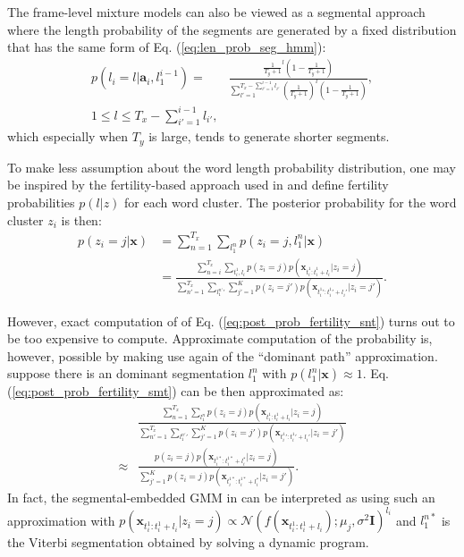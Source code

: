 \documentclass[journal]{IEEEtran}
\begin{document}
The frame-level mixture models can also be viewed as a segmental approach where the length probability of the segments are generated by a fixed distribution that has the same form of Eq. (\ref{eq:len_prob_seg_hmm}):
\begin{align}\label{eq:len_prob_seg_mixture_smt}
    p(l_i=l|\mathbf a_i, l_1^{i-1}) = &\frac{\frac{1}{T_y+1}^l (1-\frac{1}{T_y+1})}{\sum_{l'=1}^{T_x - \sum_{i'=1}^{i-1}l_{i'}}(\frac{1}{ T_y+1})^l(1-\frac{1}{T_y+1})}, \\
    1\leq l \leq T_x - \sum_{i'=1}^{i-1}l_{i'},
\end{align}
which especially when $T_y$ is large, tends to generate shorter segments.

To make less assumption about the word length probability distribution, one may be inspired by the fertility-based approach used in \cite{Brown92} and define fertility probabilities $p(l|z)$ for each word cluster. The posterior probability for the word cluster $z_i$ is then:
\begin{align}\label{eq:post_prob_fertility_smt}
    p(z_i=j|\mathbf x) &= \sum_{n=1}^{T_x}\sum_{l_1^n} p(z_i=j, l_1^{n}|\mathbf x)\\
    &= \frac{\sum_{n=i}^{T_x}\sum_{t_i^1, l_i} p(z_i=j) p(\mathbf x_{t_i^1:t_i^1+l_i}|z_i=j)}{\sum_{n'=1}^{T_x}\sum_{l_1^{n'}'}\sum_{j'=1}^K p(z_i=j') p(\mathbf x_{t_i^1':t_i^1'+l_i'}|z_i=j')}. 
\end{align}

However, exact computation of of Eq. (\ref{eq:post_prob_fertility_snt}) turns out to be too expensive to compute. Approximate computation of the probability is, however, possible by making use again of the ``dominant path'' approximation. suppose there is an dominant segmentation $l_1^n$ with $p(l_1^n|\mathbf x)\approx 1$. Eq. (\ref{eq:post_prob_fertility_smt}) can be then approximated as:
\begin{align}\label{eq:post_prob_seg_smt}
   &\frac{\sum_{n=1}^{T_x}\sum_{l_1^n} p(z_i=j) p(\mathbf x_{t_i^1:t_i^1+l_i}|z_i=j)}{\sum_{n'=1}^{T_x}\sum_{l_1^{n'}'}\sum_{j'=1}^K p(z_i=j') p(\mathbf x_{t_i^1':t_i^1'+l_i'}|z_i=j')} \\
   \approx & \frac{p(z_i=j)p(\mathbf x_{t_i^{1*}:t_i^{1*}+l_i^*}|z_i=j)}{\sum_{j'=1}^K p(z_i=j) p(\mathbf x_{t_i^{1*}:t_i^{1*}+l_i^*}|z_i=j')}.
\end{align}
In fact, the segmental-embedded GMM in \cite{Kamper17} can be interpreted as using such an approximation with $p(\mathbf x_{t_i^1:t_i^1+l_i}|z_i=j)\propto \mathcal N(f(\mathbf x_{t_i^1:t_i^1+l_i});\mu_j, \sigma^2\mathbf I)^{l_i}$ and $l_1^{n*}$ is the Viterbi segmentation obtained by solving a dynamic program. 
\end{document}
